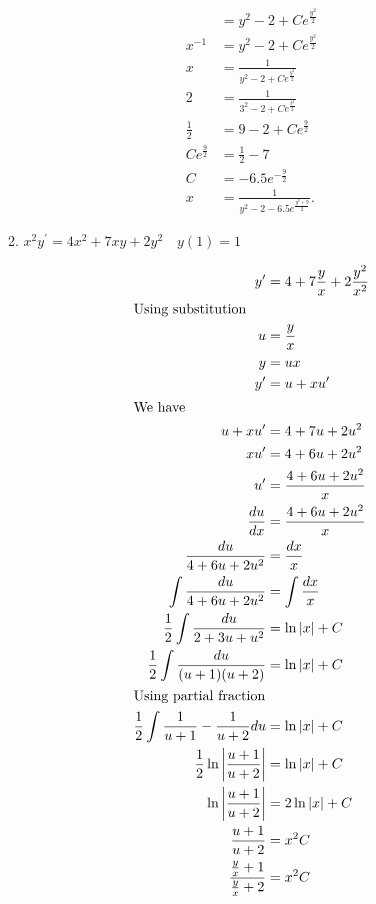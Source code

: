 \documentclass{zc-ust-hw}
\begin{document}
\begin{enumerate}
\begin{enumerate}
\begin{sol}
\begin{align}
              &= y^2 -2 + Ce^{\frac{y^2}{2}} \\
            x^{-1}&=y^2 -2 + Ce^{\frac{y^2}{2}} \\ 
            x&=\frac{1}{y^2 -2 + Ce^{\frac{y^2}{2}}} \\
            2&=\frac{1}{3^2 -2 + Ce^{\frac{3^2}{2}}} \\
            \frac{1}{2}&=9-2+Ce^{\frac{9}{2}} \\
            Ce^{\frac{9}{2}} &=\frac{1}{2}-7 \\
            C&=-6.5e^{-\frac{9}{2}} \\
            x&=\frac{1}{y^2 -2 -6.5e^{\frac{y^2+9}{2}}}
           .\end{align}
        \end{sol}
      \item $x^2 y^{\prime}=4 x^2+7 x y+2 y^2 \quad y(1)=1 $
        \begin{sol}
          \begin{align}
            y'&=4+7\frac{y}{x}+2\frac{y^2}{x^2} \\
            \intertext{Using substitution}
            u&=\frac{y}{x} \\
            y&=ux \\
            y'&=u+xu' \\
            \intertext{We have}
            u+xu'&=4+7u+2u^2 \\
            xu'&=4+6u+2u^2 \\
            u'&=\frac{4+6u+2u^2}{x} \\
            \frac{du}{dx}&=\frac{4+6u+2u^2}{x} \\
            \frac{du}{4+6u+2u^2}&=\frac{dx}{x} \\
            \int\frac{du}{4+6u+2u^2}&=\int\frac{dx}{x} \\
          \frac{1}{2}\int\frac{du}{2+3u+u^2}&=\ln |x| + C \\
          \frac{1}{2}\int \frac{du}{(u+1)(u+2)}&=\ln |x| + C \\
          \intertext{Using partial fraction}
          \frac{1}{2} \int \frac{1}{u+1}-\frac{1}{u+2}du  &=\ln |x| + C \\
          \frac{1}{2} \ln \left| \frac{u+1}{u+2} \right|  &=\ln |x| + C \\
          \ln \left| \frac{u+1}{u+2} \right| &= 2\ln |x| + C \\
          \frac{u+1}{u+2} &= x^2C \\
          \frac{\frac{y}{x}+1}{\frac{y}{x}+2} &= x^2C \\

\end{align}
\end{sol}
\end{enumerate}
\end{enumerate}
\end{document}
